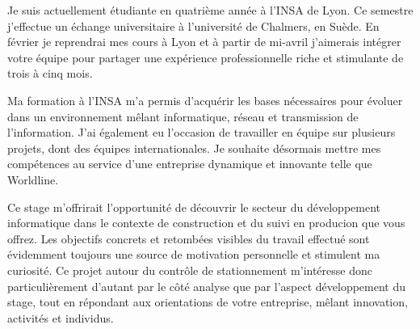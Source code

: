 \documentclass[11pt, a4paper]{awesome-cv}
\begin{document}
\makecvheader[R]


\makelettertitle

\begin{cvletter}

Je suis actuellement étudiante en quatrième année à l'INSA de Lyon. Ce semestre j'effectue un échange universitaire à l'université de Chalmers, en Suède. En février je reprendrai mes cours à Lyon et à partir de mi-avril j'aimerais intégrer votre équipe pour partager une expérience professionnelle riche et stimulante de trois à cinq mois.

\vspace{2mm} %

Ma formation à l'INSA m'a permis d'acquérir les bases nécessaires pour évoluer dans un environnement mêlant informatique, réseau et transmission de l'information. J'ai également eu l'occasion de travailler en équipe sur plusieurs projets, dont des équipes internationales. Je souhaite désormais mettre mes compétences au service d'une entreprise dynamique et innovante telle que Worldline.

\vspace{2mm} %

Ce stage m'offrirait l'opportunité de découvrir le secteur du développement informatique dans le contexte de construction et du suivi en producion que vous offrez. Les objectifs concrets et retombées visibles du travail effectué sont évidemment toujours une source de motivation personnelle et stimulent ma curiosité. Ce projet autour du contrôle de stationnement m'intéresse donc particulièrement d'autant par le côté analyse que par l'aspect développement du stage, tout en répondant aux orientations de votre entreprise, mêlant innovation, activités et individus. %

\vspace{2mm} 


\end{cvletter}
\end{document}
